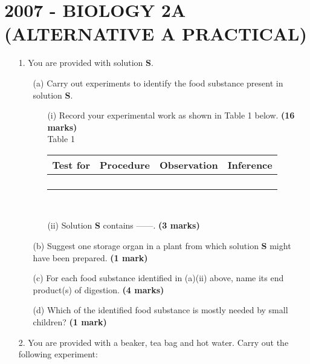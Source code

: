 \section{2007 - BIOLOGY 2A (ALTERNATIVE A PRACTICAL)}

\begin{enumerate}
\item[1.]
You are provided with solution \textbf{S}.
\begin{enumerate}
\item[(a)] Carry out experiments to identify the food substance present in solution \textbf{S}.
\begin{enumerate}
\item[(i)] Record your experimental work as shown in Table 1 below. \hfill \textbf{(16 marks)}\\

Table 1

\begin{center}
\begin{tabular}{|p{3cm}|p{3cm}|p{3cm}|p{3cm}|} \hline
\multicolumn{1}{|c|}{\textbf{Test for}}&\multicolumn{1}{c|}{\textbf{Procedure}}&\multicolumn{1}{c|}{\textbf{Observation}}&\multicolumn{1}{c|}{\textbf{Inference}} \\ \hline
&&& \\
&&& \\
&&& \\
&&& \\ \hline
\end{tabular} \\[10pt]
\end{center}

\item[(ii)] Solution \textbf{S} contains ------. \hfill \textbf{(3 marks)}
\end{enumerate}
\item[(b)] Suggest one storage organ in a plant from which solution \textbf{S} might have been prepared. \flushright \hfill \textbf{(1 mark)}
\item[(c)] For each food substance identified in (a)(ii) above, name its end product(s) of digestion. \flushright \hfill \textbf{(4 marks)}
\item[(d)] Which of the identified food substance is mostly needed by small children? \hfill \textbf{(1 mark)}
\end{enumerate}

\item[2.] You are provided with a beaker, tea bag and hot water. Carry out the following experiment:\\


\end{enumerate}

